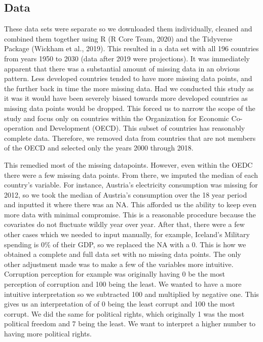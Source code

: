 \documentclass[
  english,
  man,floatsintext]{apa6}
\begin{document}
\hypertarget{data}{%
\subsection{Data}\label{data}}

These data sets were separate so we downloaded them individually, cleaned and combined them together using R (R Core Team, 2020) and the Tidyverse Package (Wickham et al., 2019). This resulted in a data set with all 196 countries from years 1950 to 2030 (data after 2019 were projections). It was immediately apparent that there was a substantial amount of missing data in an obvious pattern. Less developed countries tended to have more missing data points, and the further back in time the more missing data. Had we conducted this study as it was it would have been severely biased towards more developed countries as missing data points would be dropped. This forced us to narrow the scope of the study and focus only on countries within the Organization for Economic Co-operation and Development (OECD). This subset of countries has reasonably complete data. Therefore, we removed data from countries that are not members of the OECD and selected only the years 2000 through 2018.

This remedied most of the missing datapoints. However, even within the OEDC there were a few missing data points. From there, we imputed the median of each country's variable. For instance, Austria's electricity consumption was missing for 2012, so we took the median of Austria's consumption over the 18 year period and inputted it where there was an NA. This afforded us the ability to keep even more data with minimal compromise. This is a reasonable procedure because the covariates do not fluctuate wildly year over year. After that, there were a few other cases which we needed to input manually, for example, Iceland's Military spending is 0\% of their GDP, so we replaced the NA with a 0. This is how we obtained a complete and full data set with no missing data points. The only other adjustment made was to make a few of the variables more intuitive. Corruption perception for example was originally having 0 be the most perception of corruption and 100 being the least. We wanted to have a more intuitive interpretation so we subtracted 100 and multiplied by negative one. This gives us an interpretation of of 0 being the least corrupt and 100 the most corrupt. We did the same for political rights, which originally 1 was the most political freedom and 7 being the least. We want to interpret a higher number to having more political rights.
\end{document}
